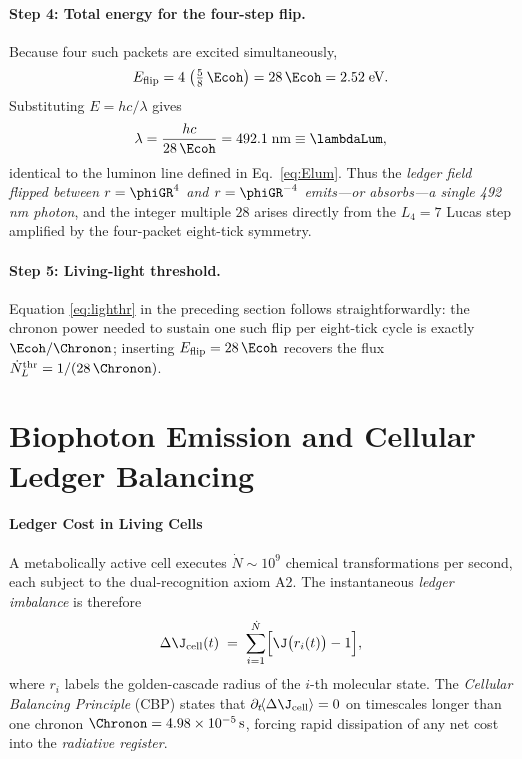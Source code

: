 \documentclass[11pt,oneside]{book}
\begin{document}
{\paragraph{Step 4: Total energy for the four-step flip.}
Because four such packets are excited simultaneously,
\[
   E_{\text{flip}}
   =
   4\;\bigl(\tfrac58\,\Ecoh\bigr)
   =
   28\,\Ecoh
   =
   2.52\;\text{eV}.
\]
Substituting \(E=hc/\lambda\) gives
\[
   \lambda
   =
   \frac{hc}{28\,\Ecoh}
   =
   492.1\;\text{nm}
   \equiv
   \lambdaLum,
\]
identical to the luminon line defined in
Eq.~\eqref{eq:Elum}.  Thus the \emph{ledger field flipped between
$r=\phiGR^{4}$ and $r=\phiGR^{-4}$ emits—or absorbs—a single 492 nm
photon}, and the integer multiple \(28\) arises directly from the
$L_{4}=7$ Lucas step amplified by the four-packet eight-tick symmetry.

\paragraph{Step 5: Living-light threshold.}
Equation \eqref{eq:lighthr} in the preceding section follows
straightforwardly: the chronon power needed to sustain one such flip
per eight-tick cycle is exactly \(\Ecoh/\Chronon\); inserting
\(E_{\text{flip}}=28\,\Ecoh\) recovers the flux
\(
   \dot N_{L}^{\text{thr}}=1/(28\,\Chronon)
\).


\section{Biophoton Emission and Cellular Ledger Balancing}
\label{sec:biophoton}

\paragraph{Ledger Cost in Living Cells}

A metabolically active cell executes
\(
   \dot N\!\sim\!10^{9}\!
\)
chemical transformations per second, each subject to the
dual-recognition axiom A2.
The instantaneous \emph{ledger imbalance}
is therefore
\[
   \Delta\J_{\text{cell}}(t)
   \;=\;
   \sum_{i=1}^{\dot N}
   \Bigl[
      \J\bigl(r_{i}(t)\bigr)-1
   \Bigr],
\]
where \(r_{i}\) labels the golden-cascade radius of the \(i\)-th
molecular state.
The \emph{Cellular Balancing Principle} (CBP) states that
\(
   \partial_{t}\!\langle\Delta\J_{\text{cell}}\rangle=0
\)
on timescales longer than one chronon
\(
   \Chronon=4.98\times10^{-5}\,\text{s}
\),
forcing rapid dissipation of any net cost into the
\emph{radiative register}.

}
\end{document}

